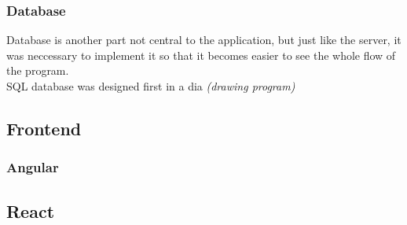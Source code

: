 \subsubsection{Database}
Database is another part not central to the application, but just like the server, it was neccessary to implement it so that it becomes easier to see the whole flow of the program.
\\SQL database was designed first in a dia \emph{(drawing program)} 
\subsection{Frontend}
\subsubsection{Angular}
\subsection{React}
